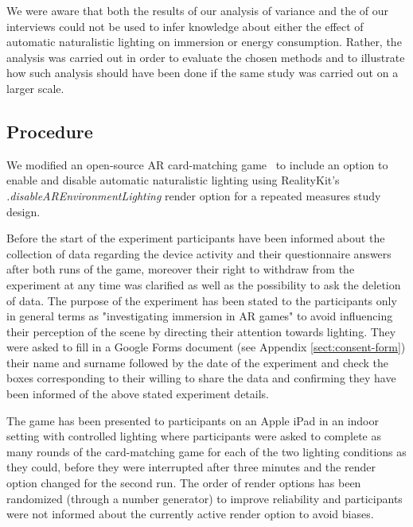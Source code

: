 \documentclass[12pt,twoside,english]{article}
\begin{document}
We were aware that both the results of our analysis of variance and the of our interviews could not be used to infer knowledge about either the effect of automatic naturalistic lighting on immersion or energy consumption.
Rather, the analysis was carried out in order to evaluate the chosen methods and to illustrate how such analysis should have been done if the same study was carried out on a larger scale.

\subsection{Procedure}
\label{sect:procedure}

We modified an open-source \gls{AR} card-matching game~\cite{cobb_maxxfrazerrealitykit-cardflip_2020} to include an option to enable and disable automatic naturalistic lighting using RealityKit's \textit{.disableAREnvironmentLighting} render option for a repeated measures study design.

Before the start of the experiment participants have been informed about the collection of data regarding the device activity and their questionnaire answers after both runs of the game, moreover their right to withdraw from the experiment at any time was clarified as well as the possibility to ask the deletion of data. The purpose of the experiment has been stated to the participants only in general terms as "investigating immersion in \gls{AR} games" to avoid influencing their perception of the scene by directing their attention towards lighting. 
They were asked to fill in a Google Forms document (see Appendix \ref{sect:consent-form}) their name and surname followed by the date of the experiment and check the boxes corresponding to their willing to share the data and confirming they have been informed of the above stated experiment details.

The game has been presented to participants on an Apple iPad in an indoor setting with controlled lighting where participants were asked to complete as many rounds of the card-matching game for each of the two lighting conditions as they could, before they were interrupted after three minutes and the render option changed for the second run.
The order of render options has been randomized (through a number generator) to improve reliability and participants were not informed about the currently active render option to avoid biases.
\end{document}
